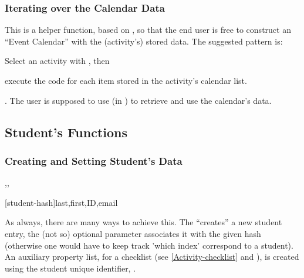 \documentclass[10pt]{article}
\begin{document}



\subsubsection{Iterating over the Calendar Data}

\begin{codedescribe}{\ActivityCalendarIterate}
  \begin{codesyntax}
  \end{codesyntax}
  This is a helper function, based on , so that the end user is free to construct an ``Event Calendar'' with the (activity's) stored data. The suggested pattern is: 
  \begin{enumerate*}
    \item Select an activity with \tsobj{\ActivitySelect}, then
    \item execute the code for each item stored in the activity's calendar list.
  \end{enumerate*}. The user is supposed to use (in ) \tsobj[code,sep=or]{\DataField,\DataGet} to retrieve and use the calendar's data.
\end{codedescribe}



\subsection{Student's Functions}

\subsubsection{Creating and Setting Student's Data}\label{student.new}

\begin{codedescribe}{\student,\studentremark,\worktitle}
  \begin{codesyntax}
    \tsmacro{\student}[student-hash]{last,first,ID,email}
  \end{codesyntax}
  As always, there are many ways to achieve this. The \tsobj{\student} ``creates'' a new student entry, the (not so) optional parameter  associates it with the given hash (otherwise one would have to keep track 'which index' correspond to a student). An auxiliary property list, for a checklist (see \ref{Activity-checklist} and \tsobj{\StudentCheckListTable} ), is created using  the student unique identifier, .
\end{codedescribe}
\end{document}

